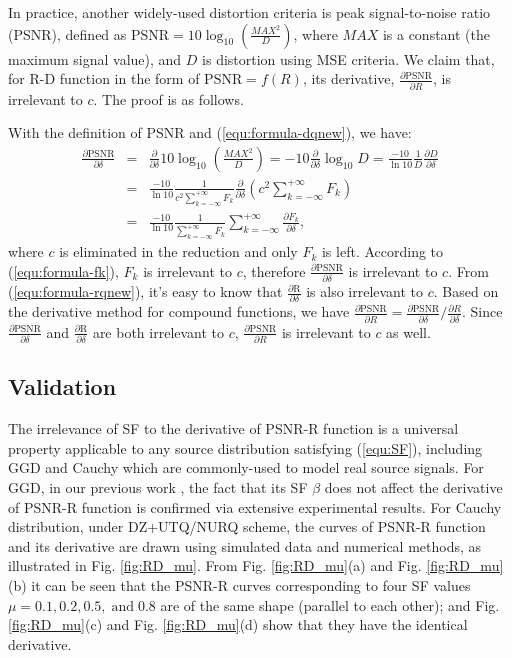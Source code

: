 \documentclass[smallabstract,smallcaptions]{dccpaper}
\begin{document}
In practice, another widely-used distortion criteria is peak signal-to-noise ratio (PSNR), defined as $\textrm{PSNR} = 10 \log_{10}\left(\frac{MAX^2}{D}\right)$, where $MAX$ is a constant (the maximum signal value), and $D$ is distortion using MSE criteria. We claim that, for R-D function in the form of $\textrm{PSNR}=f(R)$, its derivative, $\frac{\partial\textrm{PSNR}}{\partial R}$, is irrelevant to $c$. The proof is as follows.

With the definition of PSNR and (\ref{equ:formula-dqnew}), we have:
{\footnotesize
\begin{eqnarray*}
\frac{\partial\text{PSNR}}{\partial\delta}
&=&\frac{\partial}{\partial\delta}10 \log_{10}\left(\frac{MAX^2}{D}\right)
=-10\frac{\partial}{\partial\delta}\log_{10}D
=\frac{-10}{\ln{10}}\frac{1}{D}\frac{\partial D}{\partial\delta}
\\&=&\frac{-10}{\ln{10}}\frac{1}{c^2 \sum_{k=-\infty}^{+\infty} F_k}\frac{\partial}{\partial\delta} \left(c^2 \sum_{k=-\infty}^{+\infty} F_k\right)
\\&=&\frac{-10}{\ln{10}}\frac{1}{\sum_{k=-\infty}^{+\infty} F_k}\sum_{k=-\infty}^{+\infty} \frac{\partial F_k}{\partial\delta},
\end{eqnarray*}
}where $c$ is eliminated in the reduction and only $F_k$ is left. According to (\ref{equ:formula-fk}), $F_k$ is irrelevant to $c$, therefore $\frac{\partial\textrm{PSNR}}{\partial\delta}$ is irrelevant to $c$. From (\ref{equ:formula-rqnew}), it's easy to know that $\frac{\partial\textrm{R}}{\partial\delta}$ is also irrelevant to $c$. Based on the derivative method for compound functions, we have $\frac{\partial\textrm{PSNR}}{\partial R} = \frac{\partial\textrm{PSNR}}{\partial\delta}/\frac{\partial R}{\partial\delta}$. Since $\frac{\partial\textrm{PSNR}}{\partial\delta}$ and $\frac{\partial\textrm{R}}{\partial\delta}$ are both irrelevant to $c$, $\frac{\partial\textrm{PSNR}}{\partial R}$ is irrelevant to $c$ as well.

\subsection{Validation}

The irrelevance of SF to the derivative of PSNR-R function is a universal property applicable to any source distribution satisfying (\ref{equ:SF}), including GGD and Cauchy which are commonly-used to model real source signals. For GGD, in our previous work \cite{Sun_TCSVT2009}, the fact that its SF $\beta$ does not affect the derivative of PSNR-R function is confirmed via extensive experimental results. For Cauchy distribution, under DZ+UTQ/NURQ scheme, the curves of PSNR-R function and its derivative are drawn using simulated data and numerical methods, as illustrated in Fig. \ref{fig:RD_mu}. From Fig. \ref{fig:RD_mu}(a) and Fig. \ref{fig:RD_mu}(b) it can be seen that the PSNR-R curves corresponding to four SF values $\mu = 0.1, 0.2, 0.5, \; \textrm{and} \;0.8$ are of the same shape (parallel to each other); and Fig.\ref{fig:RD_mu}(c) and Fig. \ref{fig:RD_mu}(d) show that they have the identical derivative.
\end{document}
